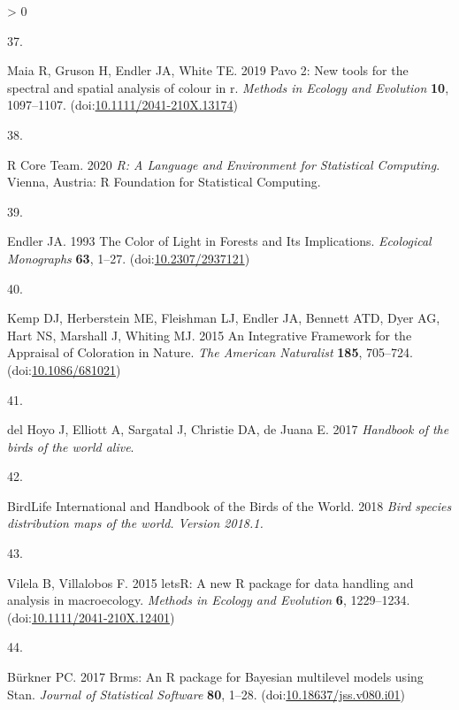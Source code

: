 \documentclass[
  a4paper,
]{article}
\newlength{\cslhangindent}
\newlength{\csllabelwidth}
\newenvironment{CSLReferences}[2] %
 {%
  \setlength{\parindent}{0pt}
  \ifodd #1 \everypar{\setlength{\hangindent}{\cslhangindent}}\ignorespaces\fi
  \ifnum #2 > 0
  \setlength{\parskip}{#2\baselineskip}
  \fi
 }%
 {}
\newcommand{\CSLLeftMargin}[1]{\parbox[t]{\csllabelwidth}{#1}}
\newcommand{\CSLRightInline}[1]{\parbox[t]{\linewidth - \csllabelwidth}{#1}\break}
\begin{document}
\begin{CSLReferences}{0}{0}
\leavevmode\hypertarget{ref-maia2019}{}%
\CSLLeftMargin{37. }
\CSLRightInline{Maia R, Gruson H, Endler JA, White TE. 2019 Pavo 2:
{New} tools for the spectral and spatial analysis of colour in r.
\emph{Methods in Ecology and Evolution} \textbf{10}, 1097--1107.
(doi:\href{https://doi.org/10.1111/2041-210X.13174}{10.1111/2041-210X.13174})}

\leavevmode\hypertarget{ref-rcoreteam2020}{}%
\CSLLeftMargin{38. }
\CSLRightInline{R Core Team. 2020 \emph{R: {A Language} and
{Environment} for {Statistical Computing}}. {Vienna, Austria}: {R
Foundation for Statistical Computing}. }

\leavevmode\hypertarget{ref-endler1993}{}%
\CSLLeftMargin{39. }
\CSLRightInline{Endler JA. 1993 The {Color} of {Light} in {Forests} and
{Its Implications}. \emph{Ecological Monographs} \textbf{63}, 1--27.
(doi:\href{https://doi.org/10.2307/2937121}{10.2307/2937121})}

\leavevmode\hypertarget{ref-kemp2015}{}%
\CSLLeftMargin{40. }
\CSLRightInline{Kemp DJ, Herberstein ME, Fleishman LJ, Endler JA,
Bennett ATD, Dyer AG, Hart NS, Marshall J, Whiting MJ. 2015 An
{Integrative Framework} for the {Appraisal} of {Coloration} in {Nature}.
\emph{The American Naturalist} \textbf{185}, 705--724.
(doi:\href{https://doi.org/10.1086/681021}{10.1086/681021})}

\leavevmode\hypertarget{ref-delhoyo2017}{}%
\CSLLeftMargin{41. }
\CSLRightInline{del Hoyo J, Elliott A, Sargatal J, Christie DA, de Juana
E. 2017 \emph{Handbook of the birds of the world alive}. }

\leavevmode\hypertarget{ref-birdlifeinternationalandhandbookofthebirdsoftheworld2018}{}%
\CSLLeftMargin{42. }
\CSLRightInline{BirdLife International and Handbook of the Birds of the
World. 2018 \emph{Bird species distribution maps of the world. {Version}
2018.1.} }

\leavevmode\hypertarget{ref-vilela2015}{}%
\CSLLeftMargin{43. }
\CSLRightInline{Vilela B, Villalobos F. 2015 {letsR}: {A} new {R}
package for data handling and analysis in macroecology. \emph{Methods in
Ecology and Evolution} \textbf{6}, 1229--1234.
(doi:\href{https://doi.org/10.1111/2041-210X.12401}{10.1111/2041-210X.12401})}

\leavevmode\hypertarget{ref-burkner2017}{}%
\CSLLeftMargin{44. }
\CSLRightInline{Bürkner PC. 2017 Brms: {An R} package for {Bayesian}
multilevel models using {Stan}. \emph{Journal of Statistical Software}
\textbf{80}, 1--28.
(doi:\href{https://doi.org/10.18637/jss.v080.i01}{10.18637/jss.v080.i01})}


\end{CSLReferences}
\end{document}
